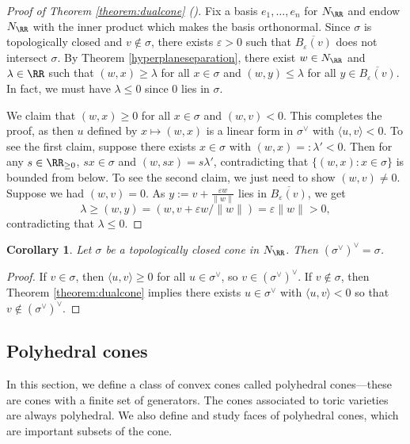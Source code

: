 \documentclass[12pt]{amsart}
\theoremstyle{plain}
\newtheorem{corollary}[theorem]{Corollary}
\begin{document}
\begin{proof}[Proof of Theorem \ref{theorem:dualcone} \textup{(\cite[Example 2.20]{BV04})}]
Fix a basis $e_1, \ldots, e_n$ for $N_\RR$ and endow $N_\RR$ with the inner product which makes the basis orthonormal.
Since $\sigma$ is topologically closed and $v \notin \sigma$, there exists $\varepsilon > 0$ such that $\overline{B_\varepsilon(v)}$ does not intersect $\sigma$.
By Theorem \ref{hyperplaneseparation}, there exist $w \in N_\RR$ and $\lambda \in \RR$ such that $(w, x) \ge \lambda$ for all $x \in \sigma$ and $(w, y) \le \lambda$ for all $y \in \overline{B_\varepsilon(v)}$.
In fact, we must have $\lambda \le 0$ since $0$ lies in $\sigma$.

We claim that $(w, x) \ge 0$ for all $x \in \sigma$ and $(w, v) < 0$.
This completes the proof, as then $u$ defined by $x \mapsto (w, x)$ is a linear form in $\sigma^\vee$ with $\langle u, v \rangle < 0$.
To see the first claim, suppose there exists $x \in \sigma$ with $(w, x) =: \lambda' < 0$.
Then for any $s \in \RR_{\ge 0}$, $s x \in \sigma $ and $(w, s x) = s \lambda'$, contradicting that $\{(w, x) : x \in \sigma\}$ is bounded from below.
To see the second claim, we just need to show $(w, v) \ne 0$.
Suppose we had $(w, v) = 0$.
As $y := v + \frac{\varepsilon w}{\|w\|}$ lies in $\overline{B_\varepsilon(v)}$, we get
$$\lambda \ge (w, y) = (w, v + \varepsilon w/\|w\|) = \varepsilon \|w\| > 0,$$
contradicting that $\lambda \le 0$.
\end{proof}

\begin{corollary}\label{corollary:doubledual}
Let $\sigma$ be a topologically closed cone in $N_\RR$.
Then $(\sigma^\vee)^\vee = \sigma$.
\end{corollary}
\begin{proof}
If $v \in \sigma$, then $\langle u, v\rangle \ge 0$ for all $u \in \sigma^\vee$, so $v \in (\sigma^\vee)^\vee$.
If $v \notin \sigma$, then Theorem \ref{theorem:dualcone} implies there exists $u \in \sigma^\vee$ with $\langle u, v \rangle < 0$ so that $v \notin (\sigma^\vee)^\vee$.
\end{proof}





\subsection{Polyhedral cones}\label{polyhedralcones}
In this section, we define a class of convex cones called polyhedral cones---these are cones with a finite set of generators.
The cones associated to toric varieties are always polyhedral.
We also define and study faces of polyhedral cones, which are important subsets of the cone.
\end{document}
